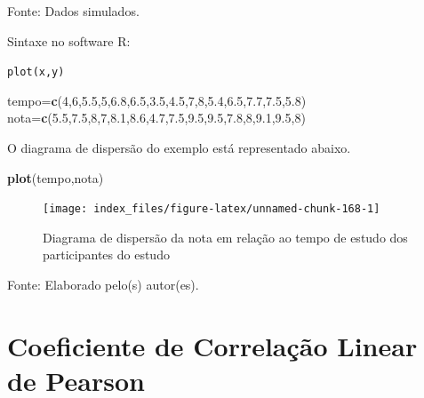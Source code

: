\documentclass[12pt,brazil,oneside]{book}
\newenvironment{Shaded}{\begin{snugshade}}{\end{snugshade}}
\newcommand{\DecValTok}[1]{\textcolor[rgb]{0.00,0.00,0.81}{#1}}
\newcommand{\FloatTok}[1]{\textcolor[rgb]{0.00,0.00,0.81}{#1}}
\newcommand{\KeywordTok}[1]{\textcolor[rgb]{0.13,0.29,0.53}{\textbf{#1}}}
\newcommand{\NormalTok}[1]{#1}
\begin{document}
Fonte: Dados simulados.

Sintaxe no software R:

\texttt{plot(x,y)}

\begin{Shaded}
\begin{Highlighting}[]
\NormalTok{tempo=}\KeywordTok{c}\NormalTok{(}\DecValTok{4}\NormalTok{,}\DecValTok{6}\NormalTok{,}\FloatTok{5.5}\NormalTok{,}\DecValTok{5}\NormalTok{,}\FloatTok{6.8}\NormalTok{,}\FloatTok{6.5}\NormalTok{,}\FloatTok{3.5}\NormalTok{,}\FloatTok{4.5}\NormalTok{,}\DecValTok{7}\NormalTok{,}\DecValTok{8}\NormalTok{,}\FloatTok{5.4}\NormalTok{,}\FloatTok{6.5}\NormalTok{,}\FloatTok{7.7}\NormalTok{,}\FloatTok{7.5}\NormalTok{,}\FloatTok{5.8}\NormalTok{)}
\NormalTok{nota=}\KeywordTok{c}\NormalTok{(}\FloatTok{5.5}\NormalTok{,}\FloatTok{7.5}\NormalTok{,}\DecValTok{8}\NormalTok{,}\DecValTok{7}\NormalTok{,}\FloatTok{8.1}\NormalTok{,}\FloatTok{8.6}\NormalTok{,}\FloatTok{4.7}\NormalTok{,}\FloatTok{7.5}\NormalTok{,}\FloatTok{9.5}\NormalTok{,}\FloatTok{9.5}\NormalTok{,}\FloatTok{7.8}\NormalTok{,}\DecValTok{8}\NormalTok{,}\FloatTok{9.1}\NormalTok{,}\FloatTok{9.5}\NormalTok{,}\DecValTok{8}\NormalTok{)}
\end{Highlighting}
\end{Shaded}

O diagrama de dispersão do exemplo está representado abaixo.

\begin{Shaded}
\begin{Highlighting}[]
\KeywordTok{plot}\NormalTok{(tempo,nota)}
\end{Highlighting}
\end{Shaded}

\begin{figure}[H]

{\centering \texttt{[image: index\_files/figure-latex/unnamed-chunk-168-1]} 

}

\caption{Diagrama de dispersão da nota em relação ao tempo de estudo dos participantes do estudo}\label{fig:unnamed-chunk-168}
\end{figure}

Fonte: Elaborado pelo(s) autor(es).

\hypertarget{coeficiente-de-correlacao-linear-de-pearson}{%
\section{Coeficiente de Correlação Linear de Pearson}\label{coeficiente-de-correlacao-linear-de-pearson}}
\end{document}
